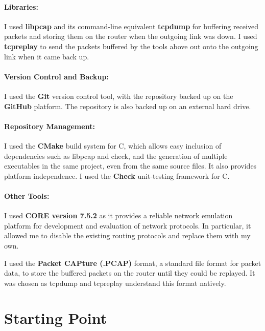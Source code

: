 \documentclass[withindex,glossary,openany]{cam-thesis}
\begin{document}
\paragraph{Libraries:}

I used \textbf{libpcap} and its command-line equivalent \textbf{tcpdump} for buffering received packets and storing them on the router when the outgoing link was down. I used \textbf{tcpreplay} to send the packets buffered by the tools above out onto the outgoing link when it came back up.

\paragraph{Version Control and Backup:}

I used the \textbf{Git} version control tool, with the repository backed up on the \textbf{GitHub} platform. The repository is also backed up on an external hard drive.


\paragraph{Repository Management:}

I used the \textbf{CMake} build system for C, which allows easy inclusion of dependencies such as libpcap and check, and the generation of multiple executables in the same project, even from the same source files. It also provides platform independence. I used the \textbf{Check} unit-testing framework for C.


\paragraph{Other Tools:}

I used \textbf{CORE version 7.5.2} as it provides a reliable network emulation platform for development and evaluation of network protocols. In particular, it allowed me to disable the existing routing protocols and replace them with my own.

I used the \textbf{Packet CAPture (.PCAP)} format, a standard file format for packet data, to store the buffered packets on the router until they could be replayed. It was chosen as tcpdump and tcpreplay understand this format natively.


\section{Starting Point}
\end{document}
